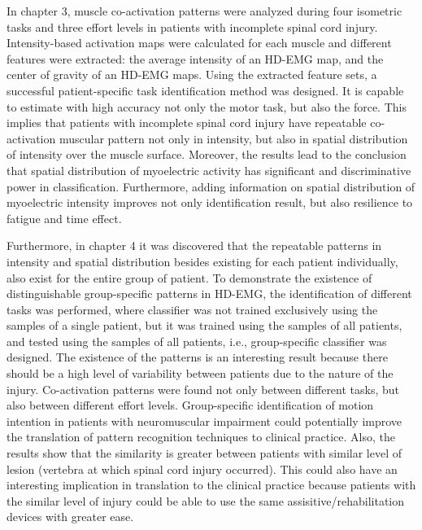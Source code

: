 In chapter 3, muscle co-activation patterns were analyzed during four isometric tasks and three effort levels in patients with incomplete spinal cord injury. Intensity-based activation maps were calculated for each muscle and different features were extracted: the average intensity of an HD-EMG map, and the center of gravity of an HD-EMG maps. Using the extracted feature sets, a successful patient-specific task identification method was designed. It is capable to estimate with high accuracy not only the motor task, but also the force. This implies that patients with incomplete spinal cord injury have repeatable co-activation muscular pattern not only in intensity, but also in spatial distribution of intensity over the muscle surface. Moreover, the results lead to the conclusion that spatial distribution of myoelectric activity has significant and discriminative power in classification. Furthermore, adding information on spatial distribution of myoelectric intensity improves not only identification result, but also resilience to fatigue and time effect.

Furthermore, in chapter 4 it was discovered that the repeatable patterns in intensity and spatial distribution besides existing for each patient individually, also exist for the entire group of patient. To demonstrate the existence of distinguishable group-specific patterns in HD-EMG, the identification of different tasks was performed, where classifier was not trained exclusively using the samples of a single patient, but it was trained using the samples of all patients, and tested using the samples of all patients, i.e., group-specific classifier was designed. The existence of the patterns is an interesting result because there should be a high level of variability between patients due to the nature of the injury. Co-activation patterns were found not only between different tasks, but also between different effort levels. Group-specific identification of motion intention in patients with neuromuscular impairment could potentially improve the translation of pattern recognition techniques to clinical practice. Also, the results show that the similarity is greater between patients with similar level of lesion (vertebra at which spinal cord injury occurred). This could also have an interesting implication in translation to the clinical practice because patients with the similar level of injury could be able to use the same assisitive/rehabilitation devices with greater ease. 

